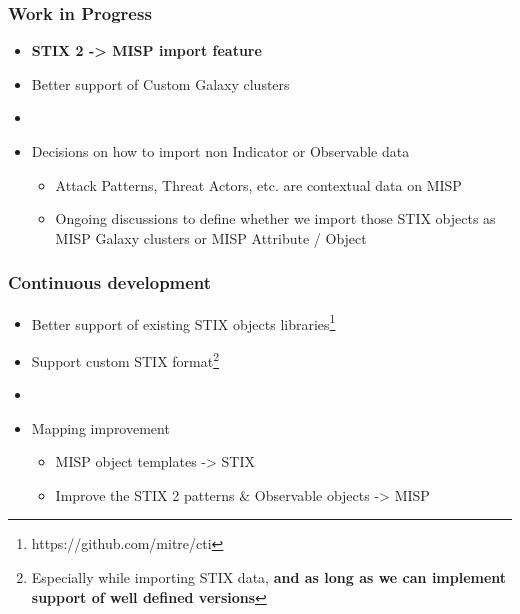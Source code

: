 \begin{frame}
    \frametitle{Work in Progress}
    \begin{itemize}
        \item {\bf STIX 2 -> MISP import feature}
        \item Better support of Custom Galaxy clusters
        \item []
        \item Decisions on how to import non Indicator or Observable data
        \begin{itemize}
            \item Attack Patterns, Threat Actors, etc. are contextual data on MISP
            \item Ongoing discussions to define whether we import those STIX objects as MISP Galaxy clusters or MISP Attribute / Object
        \end{itemize}
    \end{itemize}
\end{frame}

\begin{frame}
    \frametitle{Continuous development}
    \begin{itemize}
        \item Better support of existing STIX objects libraries\footnote{https://github.com/mitre/cti}
        \item Support custom STIX format\footnote{Especially while importing STIX data, {\bf and as long as we can implement support of well defined versions}}
        \item []
        \item Mapping improvement
        \begin{itemize}
            \item MISP object templates -> STIX
            \item Improve the STIX 2 patterns \& Observable objects -> MISP
        \end{itemize}
    \end{itemize}
\end{frame}

